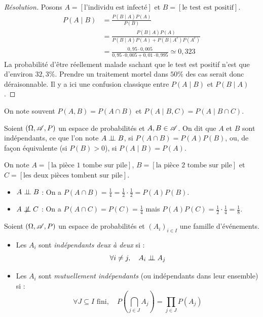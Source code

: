 \begin{proof}[Résolution]
    Posons $A = [\text{l'individu est infecté}]$ et $B=[\text{le test est positif}]$. 
    \begin{align*}
        P(A\mid B) &= \frac{P(B\mid A)P(A)}{P(B)}\\ 
        &= \frac{P(B\mid A)P(A)}{P(B\mid A)P(A)+P(B\mid A^c)P(A^c)}\\
        &= \frac{0{,}95\cdot 0{,}005}{0{,}95\cdot 0{,}005 + 0{,}01\cdot 0{,}995} \simeq 0{,}323
    \end{align*}
    La probabilité d'être réellement malade sachant que le test est positif n'est que d'environ $32{,}3\%$. Prendre un traitement mortel dans $50\%$ des cas serait donc déraisonnable. Il y a ici une confusion classique entre $P(A\mid B)$ et $P(B\mid A)$.
\end{proof}

\begin{notation}
    On note souvent $P(A,B)= P(A\cap B)$ et $P(A\mid B,C)= P(A\mid B\cap C)$.
\end{notation}

\begin{definition}[Indépendance]
    Soient $(\Omega, \mathscr{A},P)$ un espace de probabilités et $A,B\in\mathscr{A}$. On dit que $A$ et $B$ sont indépendants, ce que l'on note $A\mathrel{\perp\!\!\!\perp} B$, si $P(A\cap B) = P(A)P(B)$, ou, de façon équivalente (si $P(B)>0$), si $P(A \mid B) = P(A)$.
\end{definition}

\begin{exemple}
    On note $A=[\text{la pièce } 1 \text{ tombe sur pile}]$, $B= [\text{la pièce } 2 \text{ tombe sur pile}]$ et $C=[\text{les deux pièces tombent sur pile}]$.
    \begin{itemize}
        \item $A\mathrel{\perp\!\!\!\perp} B$ : On a $P(A\cap B) =\frac{1}{4} = \frac{1}{2}\cdot\frac{1}{2} = P(A)P(B)$.
        \item $A\nindep C$ : On a $P(A\cap C) = P(C) = \frac{1}{4}$ mais $P(A)P(C) = \frac{1}{2}\cdot\frac{1}{4} = \frac{1}{8}$.
    \end{itemize}
\end{exemple}

\begin{definition}
    Soient $(\Omega, \mathscr{A},P)$ un espace de probabilités et $(A_i)_{i\in I}$ une famille d'événements.
    \begin{itemize}
        \item Les $A_i$ sont \emph{indépendants deux à deux} si :
        \[
        \forall i\neq j, \quad A_i \mathrel{\perp\!\!\!\perp} A_j 
        \]
        \item Les $A_i$ sont \emph{mutuellement indépendants} (ou indépendants dans leur ensemble) si :
        \[
        \forall J\subseteq I \text{ fini}, \quad P\left(\bigcap_{j\in J}A_j\right)=\prod_{j\in J}P(A_j)
        \]
    \end{itemize}
\end{definition}

